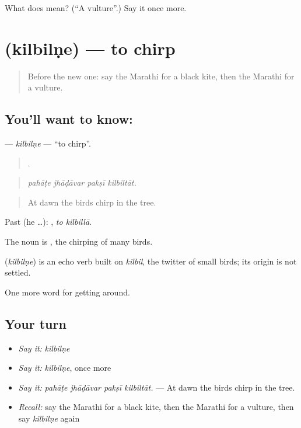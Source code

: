 \begin{tcolorbox}[breakable,colback=teal!4,colframe=teal!35!black,title={Before you move on}]
What does  mean? (\textquotedblleft{}A vulture\textquotedblright{}.) Say it once more.
\end{tcolorbox}
\section[\texorpdfstring{\mr{किलबिलणे} (kilbilṇe)}{किलबिलणे (kilbilṇe)}]{ (kilbilṇe) — to chirp}

\label{lesson:MR-C447-kilbilne}



\begin{quote}
Before the new one: say the Marathi for a black kite, then the Marathi for a vulture.
\end{quote}

\subsection*{You'll want to know: }
\textbf{} — \emph{kilbilṇe} — \textquotedblleft{}to chirp\textquotedblright{}.

\begin{quote}
   .
\end{quote}

\begin{quote}
\emph{pahāṭe jhāḍāvar pakṣī kilbiltāt.}
\end{quote}

\begin{quote}
At dawn the birds chirp in the tree.
\end{quote}

Past (he …):  , \emph{to kilbillā}.

The noun is , the chirping of many birds.

\begin{cousinweb}
\textbf{} (\emph{kilbilṇe}) is an echo verb built on \emph{kilbil}, the twitter of small birds; its origin is not settled.
\end{cousinweb}

\begin{grammarlens}[title={What you've built}]
One more word for getting around.
\end{grammarlens}

\subsection*{Your turn}
\begin{itemize}
\raggedright
  \item \emph{Say it:} \emph{kilbilṇe}
  \item \emph{Say it:} \emph{kilbilṇe}, once more
  \item \emph{Say it:} \emph{pahāṭe jhāḍāvar pakṣī kilbiltāt.} — At dawn the birds chirp in the tree.
  \item \emph{Recall:} say the Marathi for a black kite, then the Marathi for a vulture, then say \emph{kilbilṇe} again
\end{itemize}


